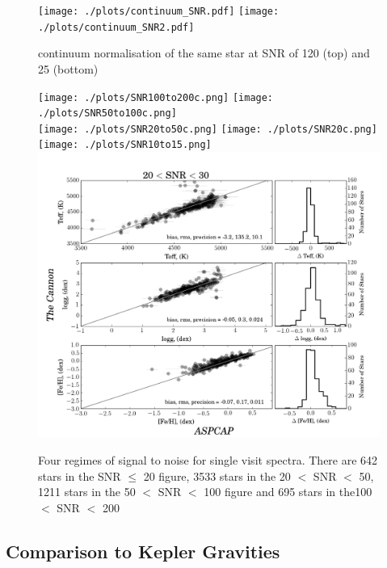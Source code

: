\documentclass[12pt, preprint]{aastex}
\begin{document}
 
\begin{figure}[h!]
  \texttt{[image: ./plots/continuum\_SNR.pdf]}
    \texttt{[image: ./plots/continuum\_SNR2.pdf]}
  
\caption{continuum normalisation of the same star at SNR of 120 (top) and 25 (bottom) }
\label{fig:lowsnr}
\end{figure}

 \begin{figure}[h!]
 \texttt{[image: ./plots/SNR100to200c.png]}
\texttt{[image: ./plots/SNR50to100c.png]}\\
\texttt{[image: ./plots/SNR20to50c.png]}
\texttt{[image: ./plots/SNR20c.png]}\\
\texttt{[image: ./plots/SNR10to15.png]}
\includegraphics[scale=0.24]{./plots/SNR20to30.png}
  \caption{Four regimes of signal to noise for single visit spectra. There are 642 stars in the SNR $\le$ 20 figure, 3533 stars in the 20 $<$ SNR $<$ 50, 1211 stars in the 50 $<$ SNR $<$ 100 figure and 695 stars in the100 $<$  SNR $<$ 200}
\label{fig:SNR}
\end{figure}


\subsection{Comparison to Kepler Gravities}

\end{document}
